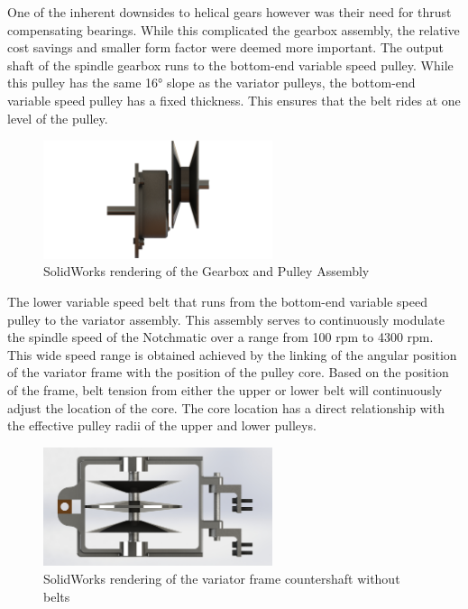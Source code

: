 One of the inherent downsides to helical gears however was their need for thrust compensating bearings. While this complicated the gearbox assembly, the relative cost savings and smaller form factor were deemed more important. The output shaft of the spindle gearbox runs to the bottom-end variable speed pulley. While this pulley has the same 16° slope as the variator pulleys, the bottom-end variable speed pulley has a fixed thickness. This ensures that the belt rides at one level of the pulley. 

\begin{figure}[H]
    \centering
    \includegraphics[width=0.6\textwidth]{./images/Chapter2-MachineDescription/GPA}
    \caption{SolidWorks rendering of the Gearbox and Pulley Assembly}
    \label{fig:GPA}
\end{figure}

The lower variable speed belt that runs from the bottom-end variable speed pulley to the variator assembly.  This assembly serves to continuously modulate the spindle speed of the Notchmatic over a range from 100 rpm to 4300 rpm. This wide speed range is obtained achieved by the linking of the angular position of the variator frame with the position of the pulley core. Based on the position of the frame, belt tension from either the upper or lower belt will continuously adjust the location of the core. The core location has a direct relationship with the effective pulley radii of the upper and lower pulleys.

\begin{figure}[H]
    \centering
    \includegraphics[width=0.6\textwidth]{./images/Chapter2-MachineDescription/VFC}
    \caption{SolidWorks rendering of the variator frame countershaft without belts}
    \label{fig:VFC}
\end{figure}

